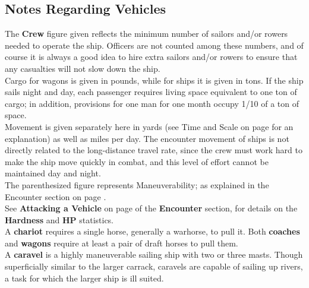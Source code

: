 \documentclass[a4paper,twoside,openany,10pt]{book}
\begin{document}
\begin{multicols}{2}
	

\subsection{Notes Regarding Vehicles}\label{notes-regarding-vehicles}

The\textbf{ Crew} figure given reflects the minimum number of sailors and/or rowers needed to operate the ship. Officers are not counted among these numbers, and of course it is always a good idea to hire extra sailors and/or rowers to ensure that any casualties will not slow down the ship.\\

Cargo for wagons is given in pounds, while for ships it is given in tons. If the ship sails night and day, each passenger requires living space equivalent to one ton of cargo; in addition, provisions for one man for one month occupy 1/10 of a ton of space.\\

Movement is given separately here in yards (see Time and Scale on page \hyperlink{time-and-scale}{\pageref{time-and-scale}} for an explanation) as well as miles per day. The encounter movement of ships is not directly related to the long-distance travel rate, since the crew must work hard to make the ship move quickly in combat, and this level of effort cannot be maintained day and night.\\

The parenthesized figure represents Maneuverability; as explained in the Encounter section on page \hyperlink{maneuverability}{\pageref{maneuverability}}.\\

See \textbf{Attacking a Vehicle} on page \hyperlink{attacking-a-vehicle}{\pageref{attacking-a-vehicle}} of the \textbf{Encounter }section, for details on the \textbf{Hardness }and \textbf{HP }statistics.\\

A \textbf{chariot }requires a single horse, generally a warhorse, to pull it. Both \textbf{coaches }and\textbf{ wagons} require at least a pair of draft horses to pull them. \\

A \textbf{caravel} is a highly maneuverable sailing ship with two or three masts. Though superficially similar to the larger carrack, caravels are capable of sailing up rivers, a task for which the larger ship is ill suited.\\


\end{multicols}
\end{document}
